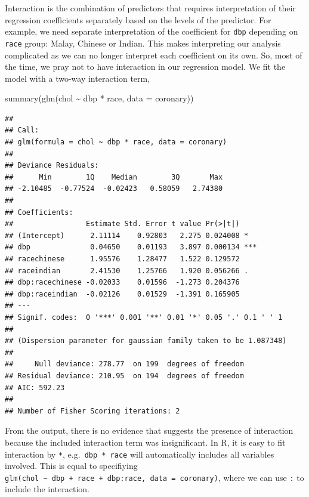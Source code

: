 \documentclass[
  10pt,
]{krantz}
\newenvironment{Shaded}{\begin{snugshade}}{\end{snugshade}}
\newcommand{\AttributeTok}[1]{\textcolor[rgb]{0.77,0.63,0.00}{#1}}
\newcommand{\FunctionTok}[1]{\textcolor[rgb]{0.00,0.00,0.00}{#1}}
\newcommand{\NormalTok}[1]{#1}
\newcommand{\SpecialCharTok}[1]{\textcolor[rgb]{0.00,0.00,0.00}{#1}}
\begin{document}
Interaction is the combination of predictors that requires interpretation of their regression coefficients separately based on the levels of the predictor. For example, we need separate interpretation of the coefficient for \texttt{dbp} depending on \texttt{race} group: Malay, Chinese or Indian. This makes interpreting our analysis complicated as we can no longer interpret each coefficient on its own. So, most of the time, we pray not to have interaction in our regression model. We fit the model with a two-way interaction term,

\begin{Shaded}
\begin{Highlighting}[]
\FunctionTok{summary}\NormalTok{(}\FunctionTok{glm}\NormalTok{(chol }\SpecialCharTok{\textasciitilde{}}\NormalTok{ dbp }\SpecialCharTok{*}\NormalTok{ race, }\AttributeTok{data =}\NormalTok{ coronary))}
\end{Highlighting}
\end{Shaded}

\begin{verbatim}
## 
## Call:
## glm(formula = chol ~ dbp * race, data = coronary)
## 
## Deviance Residuals: 
##      Min        1Q    Median        3Q       Max  
## -2.10485  -0.77524  -0.02423   0.58059   2.74380  
## 
## Coefficients:
##                 Estimate Std. Error t value Pr(>|t|)    
## (Intercept)      2.11114    0.92803   2.275 0.024008 *  
## dbp              0.04650    0.01193   3.897 0.000134 ***
## racechinese      1.95576    1.28477   1.522 0.129572    
## raceindian       2.41530    1.25766   1.920 0.056266 .  
## dbp:racechinese -0.02033    0.01596  -1.273 0.204376    
## dbp:raceindian  -0.02126    0.01529  -1.391 0.165905    
## ---
## Signif. codes:  0 '***' 0.001 '**' 0.01 '*' 0.05 '.' 0.1 ' ' 1
## 
## (Dispersion parameter for gaussian family taken to be 1.087348)
## 
##     Null deviance: 278.77  on 199  degrees of freedom
## Residual deviance: 210.95  on 194  degrees of freedom
## AIC: 592.23
## 
## Number of Fisher Scoring iterations: 2
\end{verbatim}

From the output, there is no evidence that suggests the presence of interaction because the included interaction term was insignificant. In R, it is easy to fit interaction by \texttt{*}, e.g.~\texttt{dbp\ *\ race} will automatically includes all variables involved. This is equal to specifiying \texttt{glm(chol\ \textasciitilde{}\ dbp\ +\ race\ +\ dbp:race,\ data\ =\ coronary)}, where we can use \texttt{:} to include the interaction.
\end{document}

